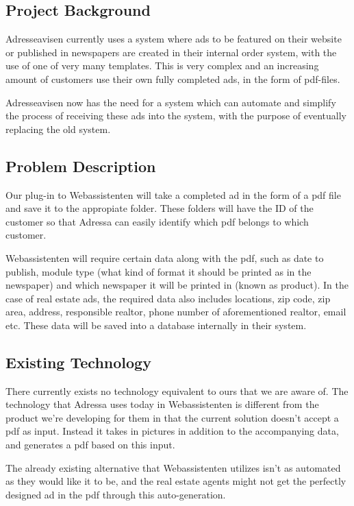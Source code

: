 \subsection{Project Background}
Adresseavisen currently uses a system where ads to be featured on their website or published in newspapers are created in their internal order system, with the use of one of very many templates. This is very complex and an increasing amount of customers use their own fully completed ads, in the form of pdf-files.

Adresseavisen now has the need for a system which can automate and simplify the process of receiving these ads into the system, with the purpose of eventually replacing the old system.

\subsection{Problem Description}
Our plug-in to Webassistenten will take a completed ad in the form of a pdf file and save it to the appropiate folder. These folders will have the ID of the customer so that Adressa can easily identify which pdf belongs to which customer.

Webassistenten will require certain data along with the pdf, such as date to publish, module type (what kind of format it should be printed as in the newspaper) and which newspaper it will be printed in (known as product). In the case of real estate ads, the required data also includes locations, zip code, zip area, address, responsible realtor, phone number of aforementioned realtor, email etc. These data will be saved into a database internally in their system. 

\subsection{Existing Technology}
There currently exists no technology equivalent to ours that we are aware of. The technology that Adressa uses today in Webassistenten is different from the product we're developing for them in that the current solution doesn't accept a pdf as input. Instead it takes in pictures in addition to the accompanying data, and generates a pdf based on this input.

The already existing alternative that Webassistenten utilizes isn't as automated as they would like it to be, and the real estate agents might not get the perfectly designed ad in the pdf through this auto-generation.

